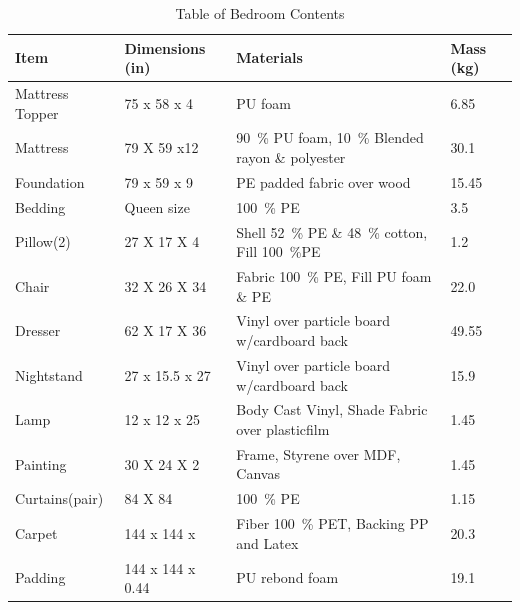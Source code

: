 \documentclass[12pt,oneside]{book}
\begin{document}
\begin{table}[!ht]
	\centering
	\caption{Table of Bedroom Contents}
	\label{tab:BRFuel}
	\begin{tabular}{llll}
		\toprule[1.5pt]
		Item 				& Dimensions (in) 	& Materials 										& Mass (kg)  \\
		\midrule
		Mattress Topper  	& 75 x 58 x 4  		& PU foam  											&  6.85     \\
		Mattress     		& 79 X 59 x12  		& 90~\% PU foam, 10~\% Blended rayon \& polyester   & 30.1  \\
		Foundation   		& 79 x 59 x 9  		& PE padded fabric over wood  						& 15.45     \\
		Bedding      		& Queen size 		& 100~\% PE     									&   3.5     \\	
		Pillow(2)	 		& 27 X 17 X 4 		& Shell 52~\% PE \& 48~\% cotton, Fill 100~\%PE 	& 1.2   \\	
		Chair				& 32 X 26 X 34		& Fabric 100~\% PE, Fill PU foam \& PE  			& 22.0  \\
		Dresser				& 62 X 17 X 36  	& Vinyl over particle board w/cardboard back		& 49.55  \\
		Nightstand			& 27 x 15.5 x 27	& Vinyl over particle board w/cardboard back		& 15.9  \\
		Lamp 				& 12 x 12 x 25		& Body Cast Vinyl, Shade Fabric over plasticfilm	& 1.45  \\
		Painting			& 30 X 24 X 2		& Frame, Styrene over MDF, Canvas					& 1.45  \\
		Curtains(pair) 		& 84 X 84 			& 100~\% PE 										& 1.15  \\
		Carpet				& 144 x 144 x 		& Fiber 100~\% PET, Backing PP and Latex			& 20.3 \\
		Padding				& 144 x 144 x 0.44	& PU rebond foam									& 19.1	\\
		\bottomrule[1.25pt]
	\end{tabular}
\end{table}
\end{document}

